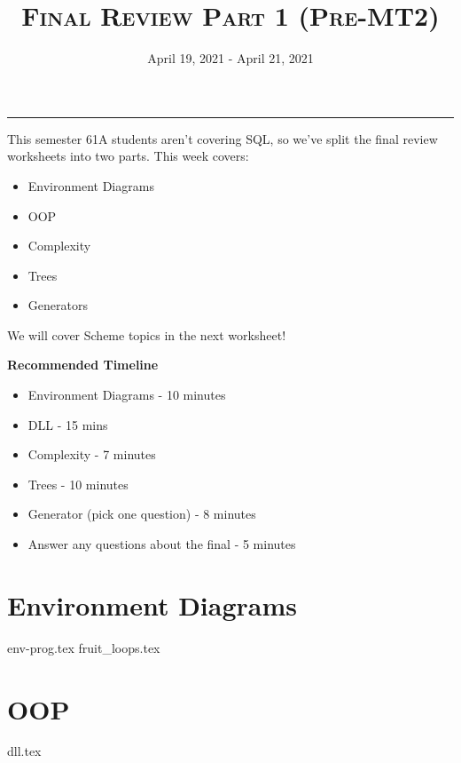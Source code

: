 \documentclass{exam}
\title{\textsc{Final Review Part 1 (Pre-MT2)}}
\date{April 19, 2021 - April 21, 2021}
\begin{document}
\maketitle\rule{\textwidth}{0.15em}
\fontsize{12}{15}\selectfont

\begin{guide}
    This semester 61A students aren't covering SQL, so we've split the final review worksheets into two parts. 
    This week covers:
    \begin{itemize}
        \item Environment Diagrams
        \item OOP
        \item Complexity
        \item Trees
        \item Generators
    \end{itemize}
    We will cover Scheme topics in the next worksheet! 

    \textbf{Recommended Timeline}
    \begin{itemize}
        \item Environment Diagrams - 10 minutes
        \item DLL - 15 mins
        \item Complexity - 7 minutes
        \item Trees - 10 minutes
        \item Generator (pick one question) - 8 minutes 
        \item Answer any questions about the final - 5 minutes
    \end{itemize}
\end{guide}

\section{Environment Diagrams}
\begin{questions}
{env-prog.tex}
{fruit_loops.tex}
\end{questions}
\newpage

\section{OOP}
\begin{questions}
{dll.tex}
\end{questions}
\newpage
\end{document}
